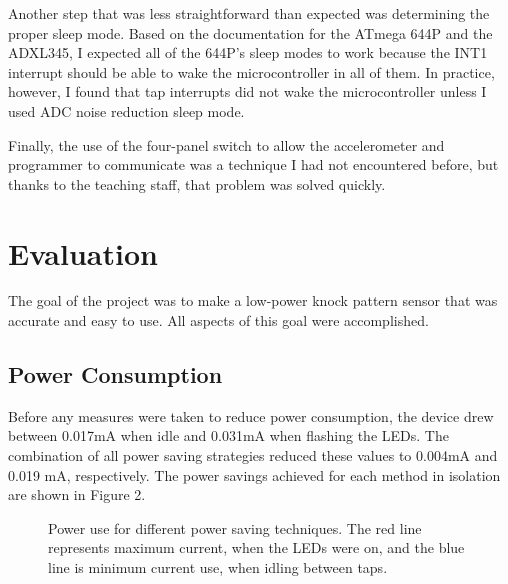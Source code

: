 \documentclass[conference]{./IEEEtran}
\begin{document}
Another step that was less straightforward than expected was determining the proper sleep mode. Based on the documentation for the ATmega 644P and the ADXL345, I expected all of the 644P's sleep modes to work because the INT1 interrupt should be able to wake the microcontroller in all of them. In practice, however, I found that tap interrupts did not wake the microcontroller unless I used ADC noise reduction sleep mode. 

Finally, the use of the four-panel switch to allow the accelerometer and programmer to communicate was a technique I had not encountered before, but thanks to the teaching staff, that problem was solved quickly.

\section{Evaluation}
The goal of the project was to make a low-power knock pattern sensor that was accurate and easy to use. All aspects of this goal were accomplished. 

\subsection{Power Consumption}
Before any measures were taken to reduce power consumption, the device drew between 0.017mA when idle and 0.031mA when flashing the LEDs. The combination of all power saving strategies reduced these values to 0.004mA and 0.019 mA, respectively. The power savings achieved for each method in isolation are shown in Figure 2.
 \begin{figure}
 \label{comparison}
 \caption{Power use for different power saving techniques. The red line represents maximum current, when the LEDs were on, and the blue line is minimum current use, when idling between taps.}

 \end{figure}
\end{document}
